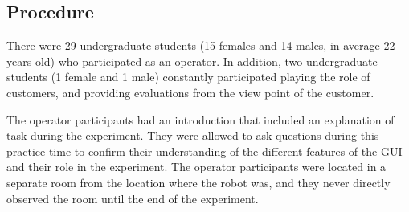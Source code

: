 \documentclass[journal]{IEEEtran}
\begin{document}

\subsection{Procedure}
There were 29 undergraduate students (15 females and 14 males, in average 22 years old) who participated as an operator. 
In addition, two undergraduate students (1 female and 1 male) constantly participated playing the role of customers, and providing evaluations from the view point of the customer. 

The operator participants had an introduction that included an explanation of task during the experiment.
They were allowed to ask questions during this practice time to confirm their understanding of the different features of the GUI and their role in the experiment.
The operator participants were located in a separate room from the location where the robot was, and they never directly observed the room until the end of the experiment.
\end{document}
